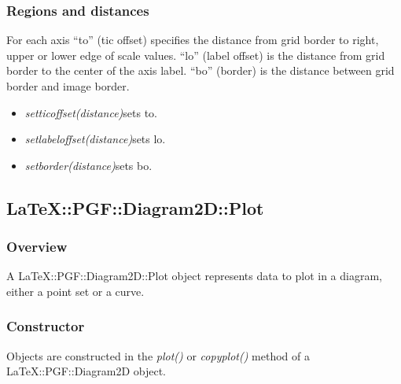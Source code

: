 \documentclass[origlongtable]{scrartcl}
\begin{document}
\subsubsection{Regions and distances}
For each axis ``to'' (tic offset) specifies the distance from grid border to
right, upper or lower edge of scale values.
``lo'' (label offset) is the distance from grid border to the center
of the axis label.
``bo'' (border) is the distance between grid border and image border.
\begin{itemize}
\item	\textit{set\textunderscore{}tic\textunderscore{}offset(distance)\/}\hfill{}sets to.
\item	\textit{set\textunderscore{}label\textunderscore{}offset(distance)\/}\hfill{}sets lo.
\item	\textit{set\textunderscore{}border(distance)\/}\hfill{}sets bo.
\end{itemize}
\clearpage
\subsection[Plot]{LaTeX::PGF::Diagram2D::Plot}
\subsubsection{Overview}
A LaTeX::PGF::Diagram2D::Plot object represents data to plot in a diagram,
either a point set or a curve.
\subsubsection{Constructor}
Objects are constructed in the \textit{plot()\/} or
\textit{copy\textunderscore{}plot()\/} method of a 
LaTeX::PGF::Diagram2D object.
\end{document}
